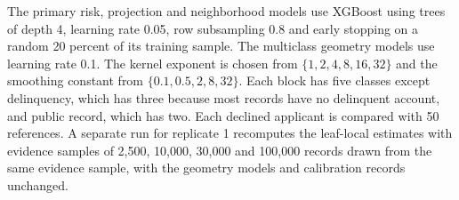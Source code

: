 The primary risk, projection and neighborhood models use XGBoost \citep{xgboost} using trees of depth 4, learning rate 0.05, row subsampling 0.8 and early stopping on a random 20 percent of its training sample. The multiclass geometry models use learning rate 0.1. The kernel exponent is chosen from $\{1,2,4,8,16,32\}$ and the smoothing constant from $\{0.1,0.5,2,8,32\}$. Each block has five classes except delinquency, which has three because most records have no delinquent account, and public record, which has two. Each declined applicant is compared with 50 references. A separate run for replicate 1 recomputes the leaf-local estimates with evidence samples of 2{,}500, 10{,}000, 30{,}000 and 100{,}000 records drawn from the same evidence sample, with the geometry models and calibration records unchanged.
